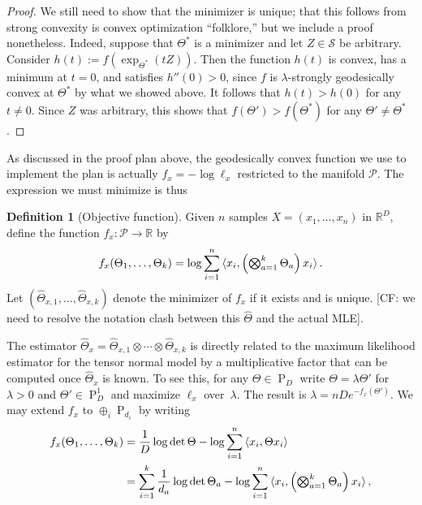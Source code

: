 \documentclass[aos]{imsart}
\theoremstyle{definition}
\newtheorem{definition}{Definition}
\newcommand{\R}{{\mathbb{R}}}
\newcommand{\ot}{\otimes}
\newcommand{\PD}{\operatorname{P}}
\newcommand{\Sym}{\mathcal{S}}
\newcommand{\SPD}{\mathcal{P}}
\newcommand{\samp}{x}
\newcommand{\rv}{X}
\newcommand{\CF}[1]{{\color{purple}[CF: #1]}}
\begin{document}
\begin{proof}

We still need to show that the minimizer is unique; that this follows from strong convexity is convex optimization ``folklore,'' but we include a proof nonetheless. Indeed, suppose that $\Theta^*$ is a minimizer and let $Z\in \Sym$ be arbitrary.
Consider $h(t) := f(\exp_{\Theta^*}(tZ))$.
Then the function $h(t)$ is convex, has a minimum at $t=0$, and satisfies $h''(0) > 0$, since $f$ is $\lambda$-strongly geodesically convex at $\Theta^*$ by what we showed above.
It follows that $h(t) > h(0)$ for any $t\neq0$.
Since $Z$ was arbitrary, this shows that $f(\Theta') > f(\Theta^*)$ for any $\Theta'\neq\Theta^*$.
\end{proof}


As discussed in the proof plan above, the geodesically convex function we use to implement the plan is actually $f_x = - \log \ell_x$ restricted to the manifold $\SPD$. The expression we must minimize is thus
 \begin{definition}[Objective function]\label{dfn:function}
Given $n$ samples $\rv = (\samp_1, \dots, \samp_n)$ in $\R^D$, define the function $f_{\samp}\colon \SPD \to \R$ by
\begin{align}\label{eq:projective-likelihood}
  f_{\samp}(\Theta_1,\dots,\Theta_k) = \log \sum_{i=1}^n \braket{\samp_i, \left( \textstyle \bigotimes_{a=1}^k \Theta_a \right) \samp_i}.
\end{align}
Let $(\widehat{\Theta}_{\samp,1}, \dots, \widehat{\Theta}_{\samp,k})$ denote the minimizer of $f_{\samp}$ if it exists and is unique. \CF{we need to resolve the notation clash between this $\widehat{\Theta}$ and the actual MLE}.
\end{definition}

The estimator $\widehat{\Theta}_{\samp} = \widehat{\Theta}_{\samp,1} \ot \cdots \ot \widehat{\Theta}_{\samp,k}$ is directly related to the maximum likelihood estimator for the tensor normal model by a multiplicative factor that can be computed once $\widehat{\Theta}_\samp$ is known. To see this, for any $\Theta \in \PD_D$ write $\Theta = \lambda \Theta'$ for $\lambda>0$ and $\Theta'\in\PD_D^1$ and maximize $\ell_\samp$ over~$\lambda$.
The result is $\lambda = n D e^{- f_\samp(\Theta')}$. We may extend $f_x$ to $\oplus_i \PD_{d_i}$ by writing
\begin{align}
  f_{\samp}(\Theta_1,\dots,\Theta_k) &=  \frac1D\log\det \Theta - \log \sum_{i=1}^n \braket{\samp_i, \Theta \samp_i} \nonumber\\
  &= \sum_{i=1}^k \frac1{d_a} \log \det \Theta_a - \log \sum_{i=1}^n \braket{\samp_i, \left( \textstyle \bigotimes_{a=1}^k \Theta_a \right) \samp_i},\label{eq:f extension}
\end{align}
\end{document}
